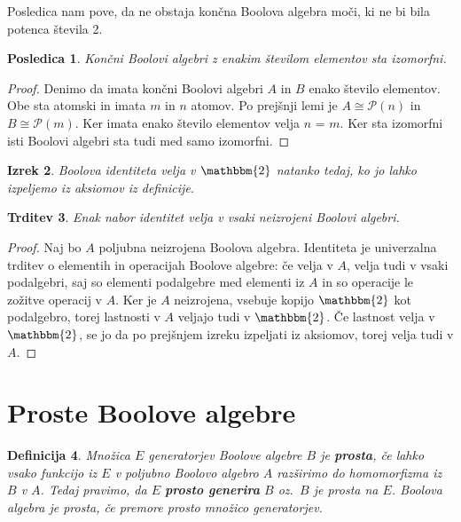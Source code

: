 \documentclass{amsart}
\newtheorem{izrek}{Izrek}[section]
\newtheorem{trditev}[izrek]{Trditev}
\newtheorem{posledica}[izrek]{Posledica}
\newtheorem{definicija}[izrek]{Definicija}
\begin{document}
Posledica nam pove, da ne obstaja končna Boolova algebra moči, ki ne bi bila potenca števila 2.

\begin{posledica}
    Končni Boolovi algebri z enakim številom elementov sta izomorfni.
\end{posledica}

\begin{proof}
    Denimo da imata končni Boolovi algebri $A$ in $B$ enako število elementov.
    Obe sta atomski in imata $m$ in $n$ atomov. Po prejšnji lemi je 
    \(A \cong \mathcal{P}(n)\) in \(B \cong \mathcal{P}(m)\). Ker imata enako
    število elementov velja $n$ = $m$. Ker sta izomorfni isti Boolovi
    algebri sta tudi med samo izomorfni.
\end{proof}

\begin{izrek}
    Boolova identiteta velja v $\mathbbm{2}$ natanko tedaj, 
    ko jo lahko izpeljemo iz aksiomov iz definicije.
\end{izrek}

\begin{trditev}
    Enak nabor identitet velja v vsaki neizrojeni Boolovi algebri.
\end{trditev}

\begin{proof}
    Naj bo $A$ poljubna neizrojena Boolova algebra.
    Identiteta je univerzalna trditev o elementih in operacijah Boolove
    algebre: če velja v $A$, velja tudi v vsaki podalgebri, saj so elementi 
    podalgebre med elementi iz $A$ in so operacije le zožitve operacij v $A$.
    Ker je $A$ neizrojena, vsebuje kopijo $\mathbbm{2}$ kot podalgebro, 
    torej lastnosti v $A$ veljajo tudi v $\mathbbm{2}$. Če lastnost velja
    v  $\mathbbm{2}$, se jo da po prejšnjem izreku izpeljati iz aksiomov,
    torej velja tudi v $A$.
\end{proof}

\section{Proste Boolove algebre}

\begin{definicija}
    Množica $E$ generatorjev Boolove algebre $B$ je \textbf{prosta}, če lahko vsako funkcijo iz $E$ v poljubno
    Boolovo algebro $A$ razširimo do homomorfizma iz $B$ v $A$. Tedaj pravimo, da $E$ \textbf{prosto generira} $B$ oz.~$B$ je prosta na $E$. Boolova algebra je prosta, če premore prosto množico generatorjev.
\end{definicija}
\end{document}
